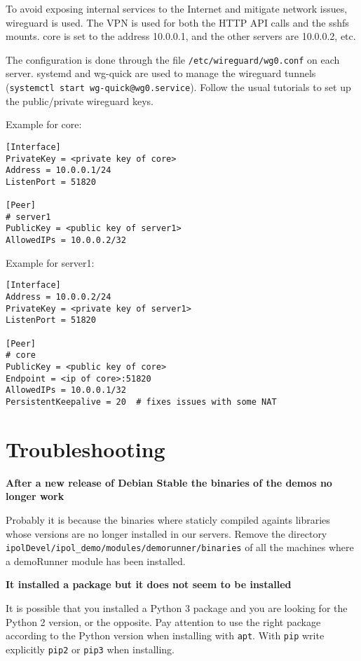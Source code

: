 \documentclass[a4paper,12pt]{article}
\begin{document}
To avoid exposing internal services to the Internet and mitigate network issues, wireguard is used.
The VPN is used for both the HTTP API calls and the sshfs mounts.
core is set to the address 10.0.0.1, and the other servers are 10.0.0.2, etc.

The configuration is done through the file {\tt /etc/wireguard/wg0.conf} on each server.
systemd and wg-quick are used to manage the wireguard tunnels ({\tt systemctl start wg-quick@wg0.service}).
Follow the usual tutorials to set up the public/private wireguard keys.

Example for core:
\begin{verbatim}
[Interface]
PrivateKey = <private key of core>
Address = 10.0.0.1/24
ListenPort = 51820

[Peer]
# server1
PublicKey = <public key of server1>
AllowedIPs = 10.0.0.2/32
\end{verbatim}

Example for server1:
\begin{verbatim}
[Interface]
Address = 10.0.0.2/24
PrivateKey = <private key of server1>
ListenPort = 51820

[Peer]
# core
PublicKey = <public key of core>
Endpoint = <ip of core>:51820
AllowedIPs = 10.0.0.1/32
PersistentKeepalive = 20  # fixes issues with some NAT
\end{verbatim}


\section{Troubleshooting}

\textbf{After a new release of Debian Stable the binaries of the demos no longer work}

Probably it is because the binaries where staticly compiled againts libraries whose versions are no longer installed in our servers. Remove the directory {\tt ipolDevel/ipol\_demo/modules/demorunner/binaries} of all the machines where a demoRunner module has been installed.
\vspace{0.5cm}

\textbf{It installed a package but it does not seem to be installed}

It is possible that you installed a Python 3 package and you are looking for the Python 2 version, or the opposite. Pay attention to use the right package according to the Python version when installing with {\tt apt}. With {\tt pip} write explicitly {\tt pip2} or {\tt pip3} when installing.
\vspace{0.5cm}
\end{document}
